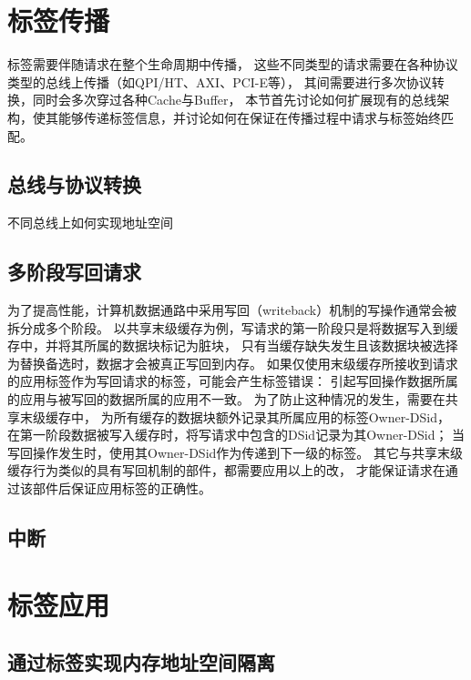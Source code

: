 \section{标签传播}

标签需要伴随请求在整个生命周期中传播，
这些不同类型的请求需要在各种协议类型的总线上传播（如QPI/HT、AXI、PCI-E等），
其间需要进行多次协议转换，同时会多次穿过各种Cache与Buffer，
本节首先讨论如何扩展现有的总线架构，使其能够传递标签信息，并讨论如何在保证在传播过程中请求与标签始终匹配。

\subsection{总线与协议转换}

不同总线上如何实现地址空间

\subsection{多阶段写回请求}

为了提高性能，计算机数据通路中采用写回（writeback）机制的写操作通常会被拆分成多个阶段。
以共享末级缓存为例，写请求的第一阶段只是将数据写入到缓存中，并将其所属的数据块标记为脏块，
只有当缓存缺失发生且该数据块被选择为替换备选时，数据才会被真正写回到内存。
如果仅使用末级缓存所接收到请求的应用标签作为写回请求的标签，可能会产生标签错误：
引起写回操作数据所属的应用与被写回的数据所属的应用不一致。
为了防止这种情况的发生，需要在共享末级缓存中，
为所有缓存的数据块额外记录其所属应用的标签Owner-DSid，
在第一阶段数据被写入缓存时，将写请求中包含的DSid记录为其Owner-DSid；
当写回操作发生时，使用其Owner-DSid作为传递到下一级的标签。
其它与共享末级缓存行为类似的具有写回机制的部件，都需要应用以上的改，
才能保证请求在通过该部件后保证应用标签的正确性。

\subsection{中断}


\section{标签应用}

\subsection{通过标签实现内存地址空间隔离}

